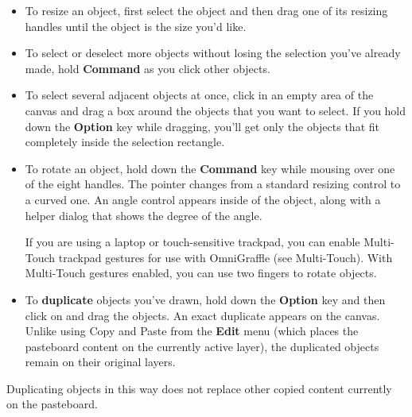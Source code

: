 \documentclass[../main.tex]{subfiles}
\begin{document}
\begin{itemize}
  \item To resize an object, first select the object and then drag one of its resizing handles
    until the object is the size you'd like.

  \item To select or deselect more objects without losing the selection you've already made,
    hold \textbf{Command} as you click other objects.

  \item To select several adjacent objects at once, click in an empty area of the canvas and
    drag a box around the objects that you want to select. If you hold down the \textbf{Option}
    key while dragging, you'll get only the objects that fit completely inside the selection
    rectangle.

  \item To rotate an object, hold down the \textbf{Command} key while mousing over one of the
    eight handles. The pointer changes from a standard resizing control to a curved one. An
    angle control appears inside of the object, along with a helper dialog that shows the degree
    of the angle.


    \begin{ogtip}
      If you are using a laptop or touch-sensitive trackpad, you can enable Multi-Touch trackpad
      gestures for use with OmniGraffle (see Multi-Touch). With Multi-Touch gestures enabled, you
      can use two fingers to rotate objects.
    \end{ogtip}
  \item To \textbf{duplicate} objects you've drawn, hold down the \textbf{Option} key and then
    click on and drag the objects. An exact duplicate appears on the canvas. Unlike using Copy
    and Paste from the \textbf{Edit} menu (which places the pasteboard content on the currently
    active layer), the duplicated objects remain on their original layers.
\end{itemize}


\begin{ognote}
  Duplicating objects in this way does not replace other copied content currently on the
  pasteboard.
\end{ognote}
\end{document}
